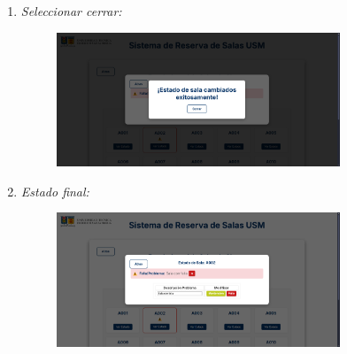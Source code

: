 \documentclass{article}
\begin{document}
\begin{enumerate}
\begin{enumerate}
            \item  \textit{Seleccionar cerrar:}
            \begin{figure}[H] 
                \centering 
                \includegraphics[width=0.8\textwidth]{IMG/ss28.png} 
            \end{figure}

            \newpage
            \item  \textit{Estado final:}
            \begin{figure}[H] 
                \centering 
                \includegraphics[width=0.8\textwidth]{IMG/ss29.png} 
            \end{figure}

            
        \end{enumerate}
    \end{enumerate}
\end{document}
